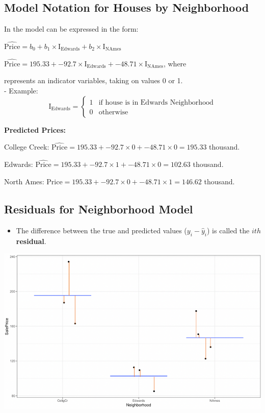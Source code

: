 \documentclass[]{book}
\providecommand{\tightlist}{%
  \setlength{\itemsep}{0pt}\setlength{\parskip}{0pt}}
\begin{document}
\subsection{Model Notation for Houses by
Neighborhood}\label{model-notation-for-houses-by-neighborhood}

In the model can be expressed in the form:

\(\widehat{\text{Price}}= b_0+ b_1 \times\text{I}_{\text{Edwards}} +b_2 \times\text{I}_{\text{NAmes}}\)

\(\widehat{\text{Price}}= 195.33+ -92.7 \times\text{I}_{\text{Edwards}} +-48.71 \times\text{I}_{\text{NAmes}}\),
where

 represents an indicator variables, taking on values 0 or 1.\\
- Example: \[ \text{I}_{\text{Edwards}} =\begin{cases} 
      1 & \text{if house is in Edwards Neighborhood} \\
      0 & \text{otherwise}
       \end{cases}
      \]

\textbf{Predicted Prices:}

College Creek:
\(\widehat{\text{Price}}= 195.33+ -92.7 \times0 +-48.71 \times0 = 195.33\)
thousand.

Edwards:
\(\widehat{\text{Price}}= 195.33+ -92.7 \times1 +-48.71 \times0 = 102.63\)
thousand.

North Ames:
\(\widehat{\text{Price}}= 195.33+ -92.7 \times0 +-48.71 \times1 = 146.62\)
thousand.

\subsection{Residuals for Neighborhood
Model}\label{residuals-for-neighborhood-model}

\begin{itemize}
\tightlist
\item
  The difference between the true and predicted values
  (\(y_i - \hat{y}_i\)) is called the \(ith\) \textbf{residual}.
\end{itemize}

\includegraphics[width=0.75\linewidth]{Cat_Resid}
\end{document}
